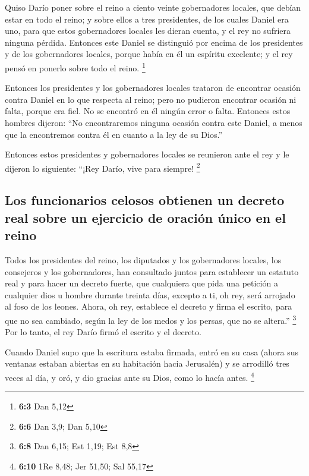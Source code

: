 \begin{paracol}{2}
 Quiso Darío poner sobre el reino a ciento veinte
gobernadores locales, que debían estar en todo el reino; 
y sobre ellos a tres presidentes, de los cuales Daniel era uno, para que
estos gobernadores locales les dieran cuenta, y el rey no sufriera
ninguna pérdida.  Entonces este Daniel se distinguió por
encima de los presidentes y de los gobernadores locales, porque había en
él un espíritu excelente; y el rey pensó en ponerlo sobre todo el reino.
\footnote{\textbf{6:3} Dan 5,12}

 Entonces los presidentes y los gobernadores locales
trataron de encontrar ocasión contra Daniel en lo que respecta al reino;
pero no pudieron encontrar ocasión ni falta, porque era fiel. No se
encontró en él ningún error o falta.  Entonces estos
hombres dijeron: ``No encontraremos ninguna ocasión contra este Daniel,
a menos que la encontremos contra él en cuanto a la ley de su Dios.''

 Entonces estos presidentes y gobernadores locales se
reunieron ante el rey y le dijeron lo siguiente: ``¡Rey Darío, vive para
siempre! \footnote{\textbf{6:6} Dan 3,9; Dan 5,10}

\hypertarget{los-funcionarios-celosos-obtienen-un-decreto-real-sobre-un-ejercicio-de-oraciuxf3n-uxfanico-en-el-reino}{%
\subsection{Los funcionarios celosos obtienen un decreto real sobre un
ejercicio de oración único en el
reino}\label{los-funcionarios-celosos-obtienen-un-decreto-real-sobre-un-ejercicio-de-oraciuxf3n-uxfanico-en-el-reino}}

 Todos los presidentes del reino, los diputados y los
gobernadores locales, los consejeros y los gobernadores, han consultado
juntos para establecer un estatuto real y para hacer un decreto fuerte,
que cualquiera que pida una petición a cualquier dios u hombre durante
treinta días, excepto a ti, oh rey, será arrojado al foso de los leones.
 Ahora, oh rey, establece el decreto y firma el escrito,
para que no sea cambiado, según la ley de los medos y los persas, que no
se altera.'' \footnote{\textbf{6:8} Dan 6,15; Est 1,19; Est 8,8}
 Por lo tanto, el rey Darío firmó el escrito y el decreto.

 Cuando Daniel supo que la escritura estaba firmada,
entró en su casa (ahora sus ventanas estaban abiertas en su habitación
hacia Jerusalén) y se arrodilló tres veces al día, y oró, y dio gracias
ante su Dios, como lo hacía antes. \footnote{\textbf{6:10} 1Re 8,48; Jer
  51,50; Sal 55,17}


\end{paracol}
